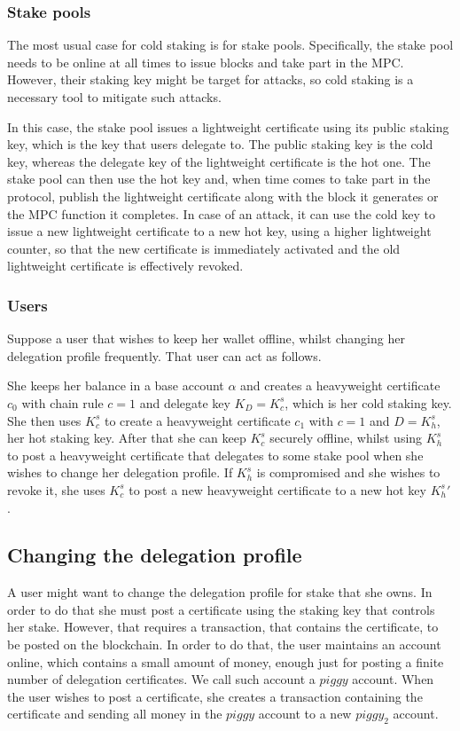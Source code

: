 \subsubsection{Stake pools}

The most usual case for cold staking is for stake pools. Specifically, the stake pool needs to be online at all times to issue blocks and take part in the MPC. However, their staking key might be target for attacks, so cold staking is a necessary tool to mitigate such attacks.

In this case, the stake pool issues a lightweight certificate using its public staking key, which is the key that users delegate to. The public staking key is the cold key, whereas the delegate key of the lightweight certificate is the hot one. The stake pool can then use the hot key and, when time comes to take part in the protocol, publish the lightweight certificate along with the block it generates or the MPC function it completes. In case of an attack, it can use the cold key to issue a new lightweight certificate to a new hot key, using a higher lightweight counter, so that the new certificate is immediately activated and the old lightweight certificate is effectively revoked.

\subsubsection{Users}

Suppose a user that wishes to keep her wallet offline, whilst changing her delegation profile frequently. That user can act as follows.

She keeps her balance in a base account $\alpha$ and creates a heavyweight certificate $c_0$ with chain rule $c = 1$ and delegate key $K_D = K^s_c$, which is her cold staking key. She then uses $K^s_c$ to create a heavyweight certificate $c_1$ with $c=1$ and $D = K^s_h$, her hot staking key. After that she can keep $K^s_c$ securely offline, whilst using $K^s_h$ to post a heavyweight certificate that delegates to some stake pool when she wishes to change her delegation profile. If $K^s_h$ is compromised and she wishes to revoke it, she uses $K^s_c$ to post a new heavyweight certificate to a new hot key ${K^s_h}'$.

\subsection{Changing the delegation profile}

A user might want to change the delegation profile for stake that she owns. In order to do that she must post a certificate using the staking key that controls her stake. However, that requires a transaction, that contains the certificate, to be posted on the blockchain. In order to do that, the user maintains an account online, which contains a small amount of money, enough just for posting a finite number of delegation certificates. We call such account a $piggy$ account. When the user wishes to post a certificate, she creates a transaction containing the certificate and sending all money in the $piggy$ account to a new ${piggy}_2$ account.

